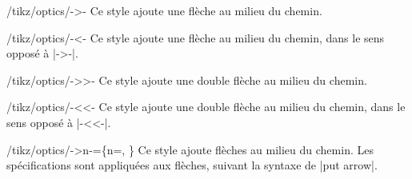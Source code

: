 \documentclass[a4paper]{ltxdoc}
\begin{document}
\begin{stylekey}{/tikz/optics/->-}
  Ce style ajoute une flèche au milieu du chemin.
  \begin{codeexample}[width=6cm]
  \end{codeexample}
\end{stylekey}

\begin{stylekey}{/tikz/optics/-<-}
  Ce style ajoute une flèche au milieu du chemin, dans le sens opposé à |->-|.
  \begin{codeexample}[width=6cm]
  \end{codeexample}
\end{stylekey}

\begin{stylekey}{/tikz/optics/->>-}
  Ce style ajoute une double flèche au milieu du chemin.
  \begin{codeexample}[width=6cm]
  \end{codeexample}
\end{stylekey}

\begin{stylekey}{/tikz/optics/-<<-}
  Ce style ajoute une double flèche au milieu du chemin, dans le sens opposé à |-<<-|.
  \begin{codeexample}[width=6cm]
  \end{codeexample}
\end{stylekey}

\begin{stylekey}{/tikz/optics/->n-=\{n=, \}}
  Ce style ajoute  flèches au milieu du chemin. Les spécifications  sont appliquées aux flèches, suivant la syntaxe de |put arrow|.
  \begin{codeexample}[width=6cm]
  \end{codeexample}
\end{stylekey}
\end{document}
